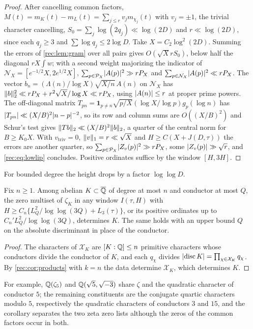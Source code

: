 \begin{proof}
After cancelling common factors, $M(t)=m_K(t)-m_L(t)=\sum_{j\le r}v_jm_{\chi_j}(t)$ with $v_j=\pm1$, the
trivial character cancelling, $S_0=\sum_j\log(2q_j)\ll\log(2D)$ and $r\ll\log(2D)$, since each $q_j\ge3$ and
$\sum\log q_j\le2\log D$. Take $X=C_2\log^2(2D)$. Summing the errors of \cref{rec:lem:gram} over all pairs
gives $O(\sqrt XrS_0)$, below half the diagonal $rX\int w$; with a second weight majorizing the
indicator of $\mathcal N_X=[e^{-1/2}X,2e^{1/2}X]$,
$\sum_{p\in\mathcal P_X}\lvert A(p)\rvert^2\gg rP_X$ and $\sum_{p\in\mathcal N_X}\lvert A(p)\rvert^2\ll rP_X$. The vector
$b_n=(\Lambda(n)/\log X)\sqrt{X/n}\,A(n)$ on $\mathcal N_X$ has $\lVert b\rVert_2^2\ll rP_X+r^2\sqrt X/\log X\ll rP_X$, using
$\lvert A(n)\rvert\le r$ at proper prime powers. The off-diagonal matrix
$T_{pn}=\mathbf 1_{p\ne n}\sqrt{p/X}(\log X/\log p)g_p(\log n)$ has $\lvert T_{pn}\rvert\ll(X/B)^2\lvert n-p\rvert^{-2}$, so its row and
column sums are $O((X/B)^2)$ and Schur's test gives $\lVert Tb\rVert_2\ll(X/B)^2\lVert b\rVert_2$, a quarter of the
central norm for $B\ge K_0X$. With $v_{\mathrm{triv}}=0$, $\lVert v\rVert_1=r\ll\sqrt X$ and $H\ge C(X+J(D,\tau))$ the
errors are another quarter, so $\sum_{p\in\mathcal P_X}\lvert Z_v(p)\rvert^2\gg rP_X$, some $\lvert Z_v(p)\rvert\gg\sqrt r$, and
\eqref{rec:eq:lowlip} concludes. Positive ordinates suffice by the window $[H,3H]$.
\end{proof}

For bounded degree the height drops by a factor $\log\log D$.

\begin{corollary}\label{rec:cor:fieldsbounded}
Fix $n\ge1$. Among abelian $K\subset\overline{\mathbb{Q}}$ of degree at most $n$ and conductor at most $Q$, the zero
multiset of $\zeta_K$ in any window $I(\tau,H)$ with $H\ge C_n\{L_Q^2/\log\log(3Q)+L_3(\tau)\}$, or its positive
ordinates up to $C_n'L_Q^2/\log\log(3Q)$, determines $K$. The same holds with an upper bound $Q$ on the
absolute discriminant in place of the conductor.
\end{corollary}

\begin{proof}
The characters of $\mathcal X_K$ are $[K:\mathbb{Q}]\le n$ primitive characters whose conductors divide the
conductor of $K$, and each $q_\chi$ divides $\lvert\operatorname{disc} K\rvert=\prod_{\chi\in\mathcal X_K}q_\chi$. By
\cref{rec:cor:products} with $k=n$ the data determine $\mathcal X_K$, which determines $K$.
\end{proof}

For example, $\mathbb{Q}(\zeta_5)$ and $\mathbb{Q}(\sqrt5,\sqrt{-3})$ share $\zeta$ and the quadratic character of
conductor $5$; the remaining constituents are the conjugate quartic characters modulo $5$, respectively
the quadratic characters of conductors $3$ and $15$, and the corollary separates the two zeta zero lists
although the zeros of the common factors occur in both.

